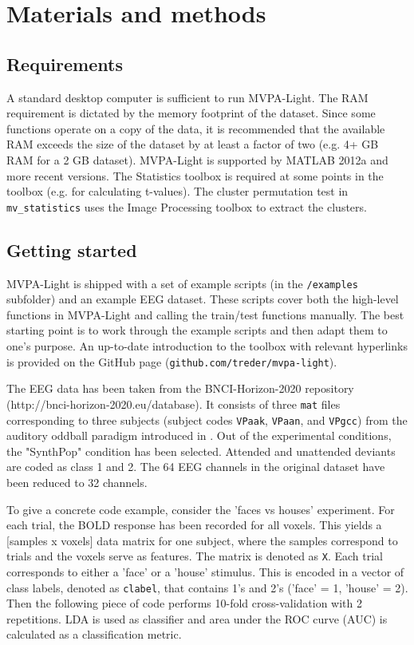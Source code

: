 \documentclass[utf8]{frontiersSCNS} %
\newcommand{\ttt}[1]{\texttt{#1}}
\begin{document}
\section{Materials and methods}

\subsection{Requirements}

A standard desktop computer is sufficient to run MVPA-Light. The RAM requirement is dictated by the memory footprint of the dataset. Since some functions operate on a copy of the data, it is recommended that the available RAM exceeds the size of the dataset by at least a factor of two (e.g. 4+ GB RAM for a 2 GB dataset). MVPA-Light is supported by MATLAB 2012a and more recent versions. The Statistics toolbox is required at some points in the toolbox (e.g. for calculating t-values). The cluster permutation test in \ttt{mv\_statistics} uses the Image Processing toolbox to extract the clusters.

\subsection{Getting started}

MVPA-Light is shipped with a set of example scripts (in the \ttt{/examples} subfolder) and an example EEG dataset. These scripts cover both the high-level functions in MVPA-Light and calling the train/test functions manually. The best starting point is to work through the example scripts and then adapt them to one's purpose. An up-to-date introduction to the toolbox with relevant hyperlinks is provided on the GitHub page (\ttt{github.com/treder/mvpa-light}).

The EEG data has been taken from the BNCI-Horizon-2020 repository (http://bnci-horizon-2020.eu/database). It consists of three \ttt{mat} files corresponding to three subjects (subject codes \ttt{VPaak}, \ttt{VPaan}, and \ttt{VPgcc}) from the auditory oddball paradigm introduced in \cite{Treder2014}. Out of the experimental conditions, the "SynthPop" condition has been selected. Attended and unattended deviants are coded as class 1 and 2. The 64 EEG channels in the original dataset have been reduced to 32 channels.

To give a concrete code example, consider the 'faces vs houses' experiment. For each trial, the BOLD response has been recorded for all voxels. This yields a [samples x voxels] data matrix for one subject, where the samples correspond to trials and the voxels serve as features. The matrix is denoted as \ttt{X}. Each trial corresponds to either a 'face' or a 'house' stimulus. This is encoded in a vector of class labels, denoted as \ttt{clabel}, that contains 1's and 2's ('face' = 1, 'house' = 2). Then the following piece of code performs 10-fold cross-validation with 2 repetitions. LDA is used as classifier and area under the ROC curve (AUC) is calculated as a classification metric.
\end{document}
